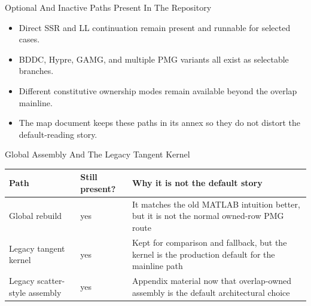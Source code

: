 \documentclass[aspectratio=169,10pt]{beamer}
\begin{document}
\begin{frame}{Optional And Inactive Paths Present In The Repository}
\small
\begin{softbox}
\begin{itemize}
  \item Direct SSR and LL continuation remain present and runnable for selected cases.
  \item BDDC, Hypre, GAMG, and multiple PMG variants all exist as selectable branches.
  \item Different constitutive ownership modes remain available beyond the overlap mainline.
  \item The map document keeps these paths in its annex so they do not distort the default-reading story.
\end{itemize}
\end{softbox}
\end{frame}

\begin{frame}{Global Assembly And The Legacy Tangent Kernel}
\small
\begin{tabularx}{\textwidth}{p{}p{}Y}
\toprule
\textbf{Path} & \textbf{Still present?} & \textbf{Why it is not the default story} \\
\midrule
Global  rebuild & yes & It matches the old MATLAB intuition better, but it is not the normal owned-row PMG route \\
Legacy tangent kernel & yes & Kept for comparison and fallback, but the  kernel is the production default for the mainline path \\
Legacy scatter-style assembly & yes & Appendix material now that overlap-owned assembly is the default architectural choice \\
\bottomrule
\end{tabularx}
\end{frame}
\end{document}
